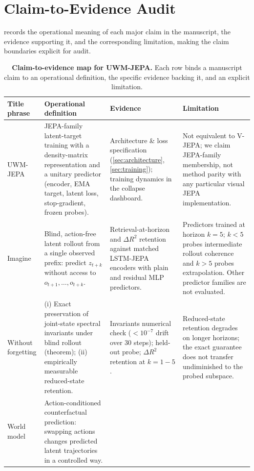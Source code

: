 \section{Claim-to-Evidence Audit}
\label{sec:claim_map}

 records the operational meaning of each major
claim in the manuscript, the evidence supporting it, and the
corresponding limitation, making the claim boundaries explicit for
audit.

\begin{table}[t]
\centering
\small
\caption{\textbf{Claim-to-evidence map for UWM-JEPA.} Each row binds a
manuscript claim to an operational definition, the specific evidence
backing it, and an explicit limitation.}
\label{tab:claim_map}
\begin{tabular}{p{2.4cm} p{4.2cm} p{4.4cm} p{4.4cm}}
\toprule
\textbf{Title phrase} & \textbf{Operational definition} &
\textbf{Evidence} & \textbf{Limitation} \\
\midrule
UWM-JEPA &
JEPA-family latent-target training with a density-matrix representation
and a unitary predictor (encoder, EMA target, latent loss,
stop-gradient, frozen probes). &
Architecture \& loss specification (\cref{sec:architecture},
\cref{sec:training}); training dynamics in the collapse dashboard. &
Not equivalent to V-JEPA; we claim JEPA-family membership, not
method parity with any particular visual JEPA implementation. \\
\addlinespace
Imagine &
Blind, action-free latent rollout from a single observed prefix:
predict $z_{t+k}$ without access to $o_{t+1}, \ldots, o_{t+k}$. &
Retrieval-at-horizon and ${\Delta}R^2$ retention against matched
LSTM-JEPA encoders with plain and residual MLP predictors. &
Predictors trained at horizon $k{=}5$; $k{<}5$ probes intermediate
rollout coherence and $k{>}5$ probes extrapolation. Other predictor
families are not evaluated. \\
\addlinespace
Without forgetting &
(i) Exact preservation of joint-state spectral invariants under blind
rollout (theorem); (ii) empirically measurable reduced-state retention. &
Invariants numerical check ($< 10^{-7}$ drift over 30 steps); held-out
probe; $\Delta R^2$ retention at $k{=}1{-}5$. &
Reduced-state retention degrades on longer horizons; the exact
guarantee does not transfer undiminished to the probed subspace. \\
\addlinespace
World model &
Action-conditioned counterfactual prediction: swapping actions changes
predicted latent trajectories in a controlled way. &

\end{tabular}
\end{table}
